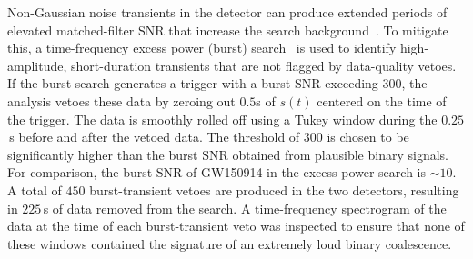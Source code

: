 Non-Gaussian noise transients in the detector can produce extended periods of
elevated matched-filter SNR that increase the search
background~\cite{Usman:2015kfa}. To mitigate this, a time-frequency excess
power (burst) search~\cite{Robinet:2015om} is used to identify high-amplitude,
short-duration transients that are not flagged by data-quality vetoes. If the
burst search generates a trigger with a burst SNR exceeding $300$, the
\pycbc{} analysis vetoes these data by zeroing out $0.5$s of $s(t)$ centered
on the time of the trigger. The data is smoothly rolled off using a Tukey
window during the $0.25$\,s before and after the vetoed data. The threshold of
$300$ is chosen to be significantly higher than the burst SNR obtained from
plausible binary signals. For comparison, the burst SNR of GW150914 in the
excess power search is $\sim 10$. A total of $450$ burst-transient vetoes are
produced in the two detectors, resulting in $225$\,s of data removed from the
search. A time-frequency spectrogram of the data at the time of each
burst-transient veto was inspected to ensure that none of these windows
contained the signature of an extremely loud binary coalescence.
